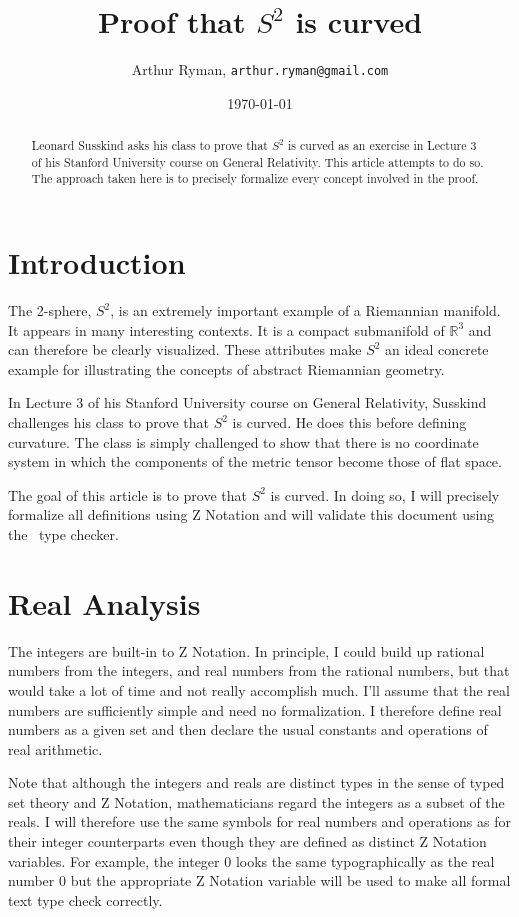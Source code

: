 \documentclass[11pt, oneside]{article}
\title{Proof that $S^2$ is curved}
\author{Arthur Ryman, {\tt arthur.ryman@gmail.com}}
\date{\today}
\newcommand{\R}{{\mathbb{R}}}
\newcommand{\Rzero}{0}
\begin{document}
\maketitle

\begin{abstract}
Leonard Susskind asks his class to prove that $S^2$ is curved as an exercise in Lecture 3 of his
Stanford University course on General Relativity.
This article attempts to do so.
The approach taken here is to precisely formalize every concept involved in the proof.
\end{abstract}

\section{Introduction}

The 2-sphere, $S^2$, is an extremely important example of a Riemannian manifold.
It appears in many interesting contexts. 
It is a compact submanifold of $\R^3$ and can therefore be clearly visualized.
These attributes make $S^2$ an ideal concrete example for illustrating the concepts of 
abstract Riemannian geometry.

In Lecture 3 of his Stanford University course on General Relativity,
Susskind challenges his class to prove that $S^2$ is curved.
He does this before defining curvature.
The class is simply challenged to show that there is no coordinate system in which the components
of the metric tensor become those of flat space.

The goal of this article is to prove that $S^2$ is curved.
In doing so, I will precisely formalize all definitions using Z Notation and will validate
this document using the \fuzz\ type checker.

\section{Real Analysis}

The integers are built-in to Z Notation.
In principle, I could build up rational numbers from the integers,
and real numbers from the rational numbers, but that would take a lot of time and not really
accomplish much.
I'll assume that the real numbers are sufficiently simple and need no formalization.
I therefore define real numbers as a given set and then declare the usual constants and operations of real arithmetic.

Note that although the integers and reals are distinct types in the sense of typed set theory and Z Notation, mathematicians regard the integers as a subset of the reals.
I will therefore use the same symbols for real numbers and operations as for their integer counterparts even though
they are defined as distinct Z Notation variables.
For example, the integer $0$ looks the same typographically as the real number $\Rzero$ 
but the appropriate Z Notation variable will be used to make all formal text type check correctly.
\end{document}
